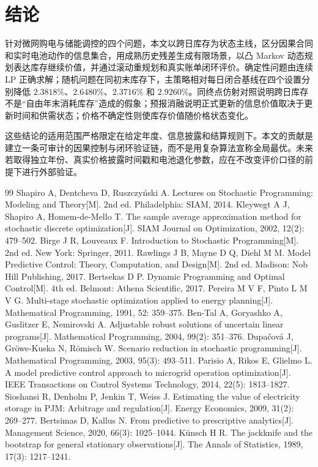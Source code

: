 \documentclass[UTF8,a4paper,zihao=-4,fontset=mac]{ctexart}
\begin{document}
\section{结论}
针对微网购电与储能调控的四个问题，本文以跨日库存为状态主线，区分因果合同和实时电池动作的信息集合，用成熟历史残差生成有限场景，以凸 Markov 动态规划表达库存继续价值，并通过滚动重规划和真实账单闭环评价。确定性问题由连续 LP 正确求解；随机问题在同初末库存下，主策略相对每日闭合基线在四个设置分别降低 $2.3818\%$、$2.6480\%$、$2.3716\%$ 和 $2.9260\%$。同终点仿射对照说明跨日库存不是“自由年末消耗库存”造成的假象；预报消融说明正式更新的信息价值取决于更新时间和供需状态；价格不确定性则使库存价值随价格状态变化。

这些结论的适用范围严格限定在给定年度、信息披露和结算规则下。本文的贡献是建立一条可审计的因果控制与闭环验证链，而不是用复杂算法宣称全局最优。未来若取得独立年份、真实价格披露时间戳和电池退化参数，应在不改变评价口径的前提下进行外部验证。

\begin{thebibliography}{99}
Shapiro A, Dentcheva D, Ruszczyński A. Lectures on Stochastic Programming: Modeling and Theory[M]. 2nd ed. Philadelphia: SIAM, 2014.
Kleywegt A J, Shapiro A, Homem-de-Mello T. The sample average approximation method for stochastic discrete optimization[J]. SIAM Journal on Optimization, 2002, 12(2): 479--502.
Birge J R, Louveaux F. Introduction to Stochastic Programming[M]. 2nd ed. New York: Springer, 2011.
Rawlings J B, Mayne D Q, Diehl M M. Model Predictive Control: Theory, Computation, and Design[M]. 2nd ed. Madison: Nob Hill Publishing, 2017.
Bertsekas D P. Dynamic Programming and Optimal Control[M]. 4th ed. Belmont: Athena Scientific, 2017.
Pereira M V F, Pinto L M V G. Multi-stage stochastic optimization applied to energy planning[J]. Mathematical Programming, 1991, 52: 359--375.
Ben-Tal A, Goryashko A, Guslitzer E, Nemirovski A. Adjustable robust solutions of uncertain linear programs[J]. Mathematical Programming, 2004, 99(2): 351--376.
Dupačová J, Gröwe-Kuska N, Römisch W. Scenario reduction in stochastic programming[J]. Mathematical Programming, 2003, 95(3): 493--511.
Parisio A, Rikos E, Glielmo L. A model predictive control approach to microgrid operation optimization[J]. IEEE Transactions on Control Systems Technology, 2014, 22(5): 1813--1827.
Sioshansi R, Denholm P, Jenkin T, Weiss J. Estimating the value of electricity storage in PJM: Arbitrage and regulation[J]. Energy Economics, 2009, 31(2): 269--277.
Bertsimas D, Kallus N. From predictive to prescriptive analytics[J]. Management Science, 2020, 66(3): 1025--1044.
Künsch H R. The jackknife and the bootstrap for general stationary observations[J]. The Annals of Statistics, 1989, 17(3): 1217--1241.
\end{thebibliography}
\end{document}
